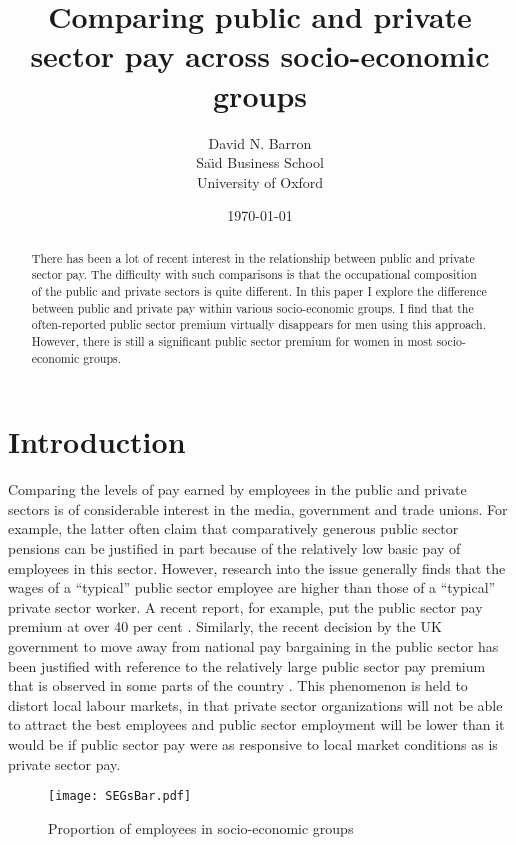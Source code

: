 \documentclass[a4paper,11pt,titlepage]{article}
\title{Comparing public and private sector pay across socio-economic groups}
\author{David N. Barron\\ Sa\"{\i}d Business School\\ University of Oxford}
\date{\today}
\let\cite\citep
\begin{document}
\maketitle

\thispagestyle{fancy}

\begin{abstract}
    There has been a lot of recent interest in the relationship between public and private sector pay.  The difficulty with such comparisons is that the occupational composition of the public and private sectors is quite different.  In this paper I explore the difference between public and private pay within various socio-economic groups. I find that the often-reported public sector premium virtually disappears for men using this approach.  However, there is still a significant public sector premium for women in most socio-economic groups.
\end{abstract}

\section{Introduction}
Comparing the levels of pay earned by employees in the public and private sectors is of considerable interest in the media, government and trade unions.  For example, the latter often claim that comparatively generous public sector pensions can be justified in part because of the relatively low basic pay of employees in this sector.  However, research into the issue generally finds that the wages of a ``typical'' public sector employee are higher than those of a ``typical'' private sector worker.  A recent report, for example, put the public sector pay premium at over 40 per cent \citep{Holmes2011}.  Similarly, the recent decision by the UK government to move away from national pay bargaining in the public sector has been justified with reference to the relatively large public sector pay premium that is observed in some parts of the country \cite{OME2012} . This phenomenon is held to distort local labour markets, in that private sector organizations will not be able to attract the best employees and public sector employment will be lower than it would be if public sector pay were as responsive to local market conditions as is private sector pay.

\begin{figure}[htb]
    \centering
    \texttt{[image: SEGsBar.pdf]}
    \caption{Proportion of employees in socio-economic groups\label{fig:segs}}
\end{figure}
\end{document}
